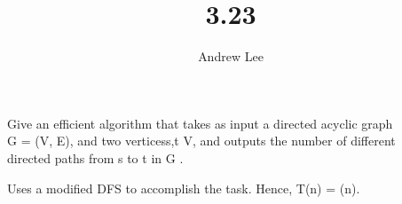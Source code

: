 \documentclass[10pt,a4paper,oneside]{article}
\begin{document}
\title{3.23}\author{Andrew Lee}\maketitle{}

\textrm{Give an efficient algorithm that takes as input a directed acyclic graph}\\G = (V, E), \textrm{ and two vertices}s,t \in V,\textrm{ and outputs the number of different}\\\textrm{ directed paths from s to t in G .}



\textrm{Uses a modified DFS to accomplish the task. Hence, }T(n) = \bigodot(n)\textrm{.}
\end{document}
